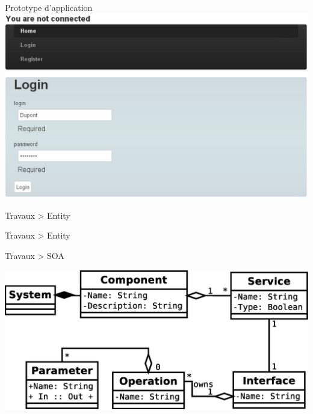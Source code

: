 \documentclass[HeilHazel,pdf,final,colorBG,slideColor]{prosper}
\begin{document}
\begin{slide}[Box]{Prototype d'application}
  \bc{} 
    \includegraphics[scale=.3]{img/screen_prototype.eps} 
  \ec{}
\end{slide}


\begin{slide}{Travaux > Entity}


\end{slide}


\begin{slide}{Travaux > Entity}

\end{slide}


\begin{slide}{Travaux > SOA}

  \bc{} 
    \includegraphics[scale=.45]{img/SOA_simple.eps}
  \ec{}

\end{slide}
\end{document}
